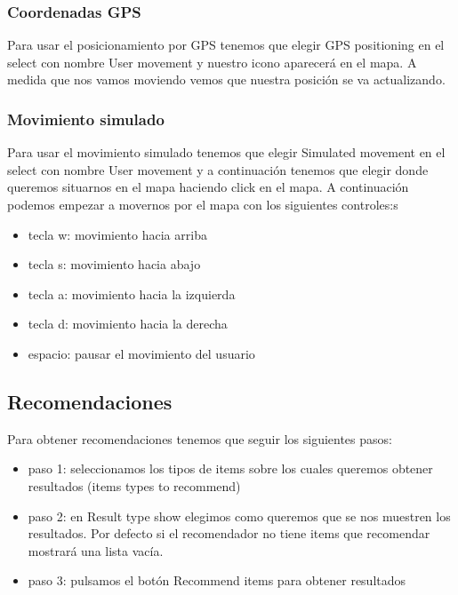 \subsubsection{Coordenadas GPS}

Para usar el posicionamiento por GPS tenemos que elegir GPS positioning en el select con nombre User movement y nuestro icono aparecerá en el mapa. A medida que nos vamos moviendo vemos que nuestra posición se va actualizando.

\subsubsection{Movimiento simulado}

Para usar el movimiento simulado tenemos que elegir Simulated movement en el select con nombre User movement y a continuación tenemos que elegir donde queremos situarnos en el mapa haciendo click en el mapa. A continuación podemos empezar a movernos por el mapa con los siguientes controles:s

\begin{itemize}
	\item tecla w: movimiento hacia arriba
	\item tecla s: movimiento hacia abajo
	\item tecla a: movimiento hacia la izquierda
	\item tecla d: movimiento hacia la derecha
	\item espacio: pausar el movimiento del usuario
\end{itemize}

\subsection{Recomendaciones}

Para obtener recomendaciones tenemos que seguir los siguientes pasos:

\begin{itemize}
	\item paso 1: seleccionamos los tipos de items sobre los cuales queremos obtener resultados (items types to recommend)
	\item paso 2: en Result type show elegimos como queremos que se nos muestren los resultados. Por defecto si el recomendador no tiene items que recomendar mostrará una lista vacía.
	\item paso 3: pulsamos el botón Recommend items para obtener resultados
\end{itemize}

